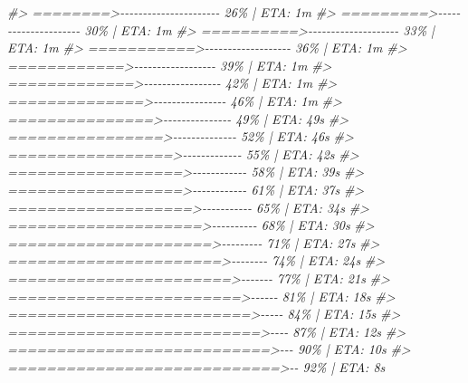 \documentclass[
]{book}
\newenvironment{Shaded}{\begin{snugshade}}{\end{snugshade}}
\newcommand{\CommentTok}[1]{\textcolor[rgb]{0.56,0.35,0.01}{\textit{#1}}}
\begin{document}
\begin{Shaded}
\begin{Highlighting}[]
\CommentTok{\#\textgreater{}  ========\textgreater{}{-}{-}{-}{-}{-}{-}{-}{-}{-}{-}{-}{-}{-}{-}{-}{-}{-}{-}{-}{-}{-}{-}   26\% |  ETA:  1m}
\CommentTok{\#\textgreater{}  =========\textgreater{}{-}{-}{-}{-}{-}{-}{-}{-}{-}{-}{-}{-}{-}{-}{-}{-}{-}{-}{-}{-}{-}   30\% |  ETA:  1m}
\CommentTok{\#\textgreater{}  ==========\textgreater{}{-}{-}{-}{-}{-}{-}{-}{-}{-}{-}{-}{-}{-}{-}{-}{-}{-}{-}{-}{-}   33\% |  ETA:  1m}
\CommentTok{\#\textgreater{}  ===========\textgreater{}{-}{-}{-}{-}{-}{-}{-}{-}{-}{-}{-}{-}{-}{-}{-}{-}{-}{-}{-}   36\% |  ETA:  1m}
\CommentTok{\#\textgreater{}  ============\textgreater{}{-}{-}{-}{-}{-}{-}{-}{-}{-}{-}{-}{-}{-}{-}{-}{-}{-}{-}   39\% |  ETA:  1m}
\CommentTok{\#\textgreater{}  =============\textgreater{}{-}{-}{-}{-}{-}{-}{-}{-}{-}{-}{-}{-}{-}{-}{-}{-}{-}   42\% |  ETA:  1m}
\CommentTok{\#\textgreater{}  ==============\textgreater{}{-}{-}{-}{-}{-}{-}{-}{-}{-}{-}{-}{-}{-}{-}{-}{-}   46\% |  ETA:  1m}
\CommentTok{\#\textgreater{}  ===============\textgreater{}{-}{-}{-}{-}{-}{-}{-}{-}{-}{-}{-}{-}{-}{-}{-}   49\% |  ETA: 49s}
\CommentTok{\#\textgreater{}  ================\textgreater{}{-}{-}{-}{-}{-}{-}{-}{-}{-}{-}{-}{-}{-}{-}   52\% |  ETA: 46s}
\CommentTok{\#\textgreater{}  =================\textgreater{}{-}{-}{-}{-}{-}{-}{-}{-}{-}{-}{-}{-}{-}   55\% |  ETA: 42s}
\CommentTok{\#\textgreater{}  ==================\textgreater{}{-}{-}{-}{-}{-}{-}{-}{-}{-}{-}{-}{-}   58\% |  ETA: 39s}
\CommentTok{\#\textgreater{}  ==================\textgreater{}{-}{-}{-}{-}{-}{-}{-}{-}{-}{-}{-}{-}   61\% |  ETA: 37s}
\CommentTok{\#\textgreater{}  ===================\textgreater{}{-}{-}{-}{-}{-}{-}{-}{-}{-}{-}{-}   65\% |  ETA: 34s}
\CommentTok{\#\textgreater{}  ====================\textgreater{}{-}{-}{-}{-}{-}{-}{-}{-}{-}{-}   68\% |  ETA: 30s}
\CommentTok{\#\textgreater{}  =====================\textgreater{}{-}{-}{-}{-}{-}{-}{-}{-}{-}   71\% |  ETA: 27s}
\CommentTok{\#\textgreater{}  ======================\textgreater{}{-}{-}{-}{-}{-}{-}{-}{-}   74\% |  ETA: 24s}
\CommentTok{\#\textgreater{}  =======================\textgreater{}{-}{-}{-}{-}{-}{-}{-}   77\% |  ETA: 21s}
\CommentTok{\#\textgreater{}  ========================\textgreater{}{-}{-}{-}{-}{-}{-}   81\% |  ETA: 18s}
\CommentTok{\#\textgreater{}  =========================\textgreater{}{-}{-}{-}{-}{-}   84\% |  ETA: 15s}
\CommentTok{\#\textgreater{}  ==========================\textgreater{}{-}{-}{-}{-}   87\% |  ETA: 12s}
\CommentTok{\#\textgreater{}  ===========================\textgreater{}{-}{-}{-}   90\% |  ETA: 10s}
\CommentTok{\#\textgreater{}  ============================\textgreater{}{-}{-}   92\% |  ETA:  8s}

\end{Highlighting}
\end{Shaded}
\end{document}
